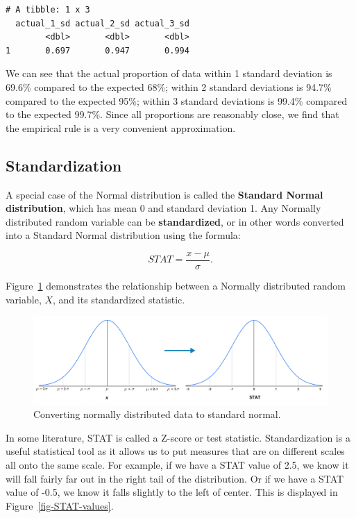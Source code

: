 \documentclass[
  letterpaper,
  DIV=11,
  numbers=noendperiod]{scrreprt}
\theoremstyle{definition}
\theoremstyle{remark}
\begin{document}
\begin{verbatim}
# A tibble: 1 x 3
  actual_1_sd actual_2_sd actual_3_sd
        <dbl>       <dbl>       <dbl>
1       0.697       0.947       0.994
\end{verbatim}

We can see that the actual proportion of data within 1 standard
deviation is 69.6\% compared to the expected 68\%; within 2 standard
deviations is 94.7\% compared to the expected 95\%; within 3 standard
deviations is 99.4\% compared to the expected 99.7\%. Since all
proportions are reasonably close, we find that the empirical rule is a
very convenient approximation.

\hypertarget{standardization}{%
\subsection{Standardization}\label{standardization}}

A special case of the Normal distribution is called the \textbf{Standard
Normal distribution}, which has mean 0 and standard deviation 1. Any
Normally distributed random variable can be \textbf{standardized}, or in
other words converted into a Standard Normal distribution using the
formula:

\[STAT = \frac{x-\mu}{\sigma}.\]

Figure~\ref{fig-standardization1} demonstrates the relationship between
a Normally distributed random variable, \(X\), and its standardized
statistic.

\begin{figure}

{\centering \includegraphics{images/standardization.png}

}

\caption{\label{fig-standardization1}Converting normally distributed
data to standard normal.}

\end{figure}

In some literature, STAT is called a Z-score or test statistic.
Standardization is a useful statistical tool as it allows us to put
measures that are on different scales all onto the same scale. For
example, if we have a STAT value of 2.5, we know it will fall fairly far
out in the right tail of the distribution. Or if we have a STAT value of
-0.5, we know it falls slightly to the left of center. This is displayed
in Figure~\ref{fig-STAT-values}.
\end{document}
